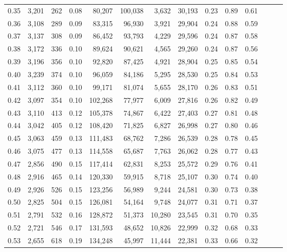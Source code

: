 \begin{tabular}{rrrrrrrrrrrrrr}
0.35 &  3,201 &  262 &  0.08 &   80,207 &  100,038 &   3,632 &  30,193 &  0.23 &  0.89 &      0.61 \\
0.36 &  3,108 &  289 &  0.09 &   83,315 &   96,930 &   3,921 &  29,904 &  0.24 &  0.88 &      0.59 \\
0.37 &  3,137 &  308 &  0.09 &   86,452 &   93,793 &   4,229 &  29,596 &  0.24 &  0.87 &      0.58 \\
0.38 &  3,172 &  336 &  0.10 &   89,624 &   90,621 &   4,565 &  29,260 &  0.24 &  0.87 &      0.56 \\
0.39 &  3,196 &  356 &  0.10 &   92,820 &   87,425 &   4,921 &  28,904 &  0.25 &  0.85 &      0.54 \\
0.40 &  3,239 &  374 &  0.10 &   96,059 &   84,186 &   5,295 &  28,530 &  0.25 &  0.84 &      0.53 \\
0.41 &  3,112 &  360 &  0.10 &   99,171 &   81,074 &   5,655 &  28,170 &  0.26 &  0.83 &      0.51 \\
0.42 &  3,097 &  354 &  0.10 &  102,268 &   77,977 &   6,009 &  27,816 &  0.26 &  0.82 &      0.49 \\
0.43 &  3,110 &  413 &  0.12 &  105,378 &   74,867 &   6,422 &  27,403 &  0.27 &  0.81 &      0.48 \\
0.44 &  3,042 &  405 &  0.12 &  108,420 &   71,825 &   6,827 &  26,998 &  0.27 &  0.80 &      0.46 \\
0.45 &  3,063 &  459 &  0.13 &  111,483 &   68,762 &   7,286 &  26,539 &  0.28 &  0.78 &      0.45 \\
0.46 &  3,075 &  477 &  0.13 &  114,558 &   65,687 &   7,763 &  26,062 &  0.28 &  0.77 &      0.43 \\
0.47 &  2,856 &  490 &  0.15 &  117,414 &   62,831 &   8,253 &  25,572 &  0.29 &  0.76 &      0.41 \\
0.48 &  2,916 &  465 &  0.14 &  120,330 &   59,915 &   8,718 &  25,107 &  0.30 &  0.74 &      0.40 \\
0.49 &  2,926 &  526 &  0.15 &  123,256 &   56,989 &   9,244 &  24,581 &  0.30 &  0.73 &      0.38 \\
0.50 &  2,825 &  504 &  0.15 &  126,081 &   54,164 &   9,748 &  24,077 &  0.31 &  0.71 &      0.37 \\
0.51 &  2,791 &  532 &  0.16 &  128,872 &   51,373 &  10,280 &  23,545 &  0.31 &  0.70 &      0.35 \\
0.52 &  2,721 &  546 &  0.17 &  131,593 &   48,652 &  10,826 &  22,999 &  0.32 &  0.68 &      0.33 \\
0.53 &  2,655 &  618 &  0.19 &  134,248 &   45,997 &  11,444 &  22,381 &  0.33 &  0.66 &      0.32 \\

\end{tabular}
